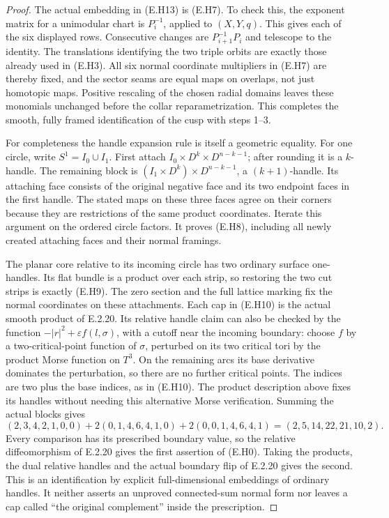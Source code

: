 \begin{proof}
The actual embedding in (E.H13) is (E.H7).  To check this,
the exponent matrix for a unimodular chart is $P_i^{-1}$,
applied to $(X,Y,q)$.  This gives each of the six displayed
rows.  Consecutive changes are $P_{i+1}^{-1}P_i$ and telescope
to the identity.  The translations identifying the two
triple orbits are exactly those already used in (E.H3).
All six normal coordinate multipliers in (E.H7) are thereby
fixed, and the sector seams are equal maps on overlaps,
not just homotopic maps.  Positive rescaling of the chosen
radial domains leaves these monomials unchanged before
the collar reparametrization.  This completes the smooth,
fully framed identification of the cusp with steps 1--3.

For completeness the handle expansion rule is itself a
geometric equality.  For one circle, write $S^1=I_0\cup I_1$.
First attach $I_0\times D^k\times D^{n-k-1}$; after rounding it
is a $k$-handle.  The remaining block is
$(I_1\times D^k)\times D^{n-k-1}$, a $(k+1)$-handle.
Its attaching face consists of the original negative face
and its two endpoint faces in the first handle.  The stated
maps on these three faces agree on their corners because
they are restrictions of the same product coordinates.
Iterate this argument on the ordered circle factors.
It proves (E.H8), including all newly created attaching
faces and their normal framings.

The planar core relative to its incoming circle has two
ordinary surface one-handles.  Its flat bundle is a product
over each strip, so restoring the two cut strips is exactly
(E.H9).  The zero section and the full lattice marking fix
the normal coordinates on these attachments.  Each cap in
(E.H10) is the actual smooth product of E.2.20.  Its relative
handle claim can also be checked by the function
$-|r|^2+\varepsilon f(l,\sigma)$, with a cutoff near the
incoming boundary: choose $f$ by a two-critical-point
function of $\sigma$, perturbed on its two critical tori
by the product Morse function on $T^3$.  On the remaining
arcs its base derivative dominates the perturbation, so
there are no further critical points.  The indices are
two plus the base indices, as in (E.H10).  The product
description above fixes its handles without needing this
alternative Morse verification.  Summing the actual blocks
gives
\[
 (2,3,4,2,1,0,0)+2(0,1,4,6,4,1,0)
                     +2(0,0,1,4,6,4,1)
       =(2,5,14,22,21,10,2).
\]
Every comparison has its prescribed boundary value, so the
relative diffeomorphism of E.2.20 gives the first assertion
of (E.H0).  Taking the products, the dual relative handles
and the actual boundary flip of E.2.20 gives the second.
This is an identification by explicit full-dimensional
embeddings of ordinary handles.  It neither asserts an
unproved connected-sum normal form nor leaves a cap called
``the original complement'' inside the prescription.


\end{proof}
